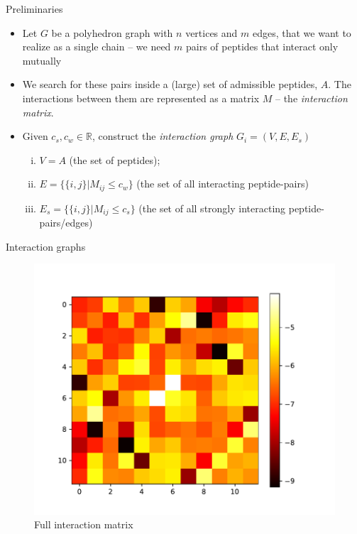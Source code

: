 \documentclass{beamer}
\theoremstyle{plain}
\theoremstyle{remark}
\begin{document}
\begin{frame}{Preliminaries}
	\begin{itemize}
		\item Let $G$ be a polyhedron graph with $n$ vertices and $m$ edges, that we want to realize as a single chain -- we need $m$ pairs of peptides that interact only mutually
		\item We search for these pairs inside a (large) set of admissible peptides, $A$. The interactions between them are represented as a matrix $M$ -- the \emph{interaction matrix}.
		\item Given $c_s, c_w \in \mathbb R$, construct the \emph{interaction graph} $G_i = (V, E, E_s)$
		\begin{enumerate}[i)]
			\item $V = A$ (the set of peptides);
			\item $E = \{ \{i, j\} | M_{ij} \leq c_w \}$ (the set of all interacting peptide-pairs) 
			\item $E_s = \{ \{i, j\} | M_{ij} \leq c_s \}$ (the set of all strongly interacting peptide-pairs/edges)
		\end{enumerate}
	\end{itemize}
\end{frame}

\begin{frame}{Interaction graphs}
\begin{figure}[h]
	\centering
	\includegraphics[width=0.7\linewidth]{interaction_matrix_full.pdf}
	\caption{Full interaction matrix}
\end{figure}
\end{frame}
\end{document}
